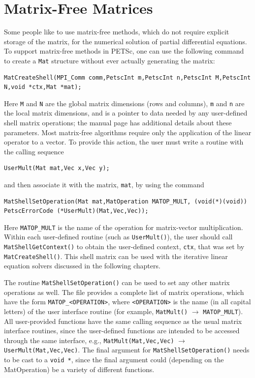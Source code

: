 \section{Matrix-Free Matrices} 
\label{sec_matrixfree}
Some people like to use matrix-free methods, which do not require
explicit storage of the matrix, for the numerical solution of partial
differential equations.  To support matrix-free methods in PETSc, one
can use the following command to create a \lstinline{Mat} structure without
ever actually generating the matrix:
\begin{lstlisting}
MatCreateShell(MPI_Comm comm,PetscInt m,PetscInt n,PetscInt M,PetscInt N,void *ctx,Mat *mat);
\end{lstlisting}
Here \lstinline{M} and \lstinline{N} are the global matrix dimensions (rows and
columns), \lstinline{m} and \lstinline{n} are the local matrix dimensions, and
 is a pointer to data needed by any user-defined shell matrix
operations; the manual page has additional details about these
parameters.  Most matrix-free algorithms require only the application
of the linear operator to a vector. To provide this action, the user
must write a routine with the calling sequence
\begin{lstlisting}
UserMult(Mat mat,Vec x,Vec y);
\end{lstlisting}
and then associate it with the matrix, \lstinline{mat}, by using the
command
\begin{lstlisting}
MatShellSetOperation(Mat mat,MatOperation MATOP_MULT, (void(*)(void)) PetscErrorCode (*UserMult)(Mat,Vec,Vec));
\end{lstlisting}
Here \lstinline{MATOP_MULT} is the name of the operation for matrix-vector
multiplication. Within each user-defined routine (such as
\lstinline{UserMult()}), the user should call
\lstinline{MatShellGetContext()} to obtain the user-defined context, \lstinline{ctx},
that was set by \lstinline{MatCreateShell()}.
This shell matrix can be used with the iterative linear
equation solvers discussed in the following chapters.

The routine \lstinline{MatShellSetOperation()} can be used to set any other
matrix operations as well.  The file
\href{https://www.mcs.anl.gov/petsc/petsc-current/include/petscmat.h.html}{} provides a complete list of matrix
operations, which have the form \lstinline{MATOP_<OPERATION>}, where \lstinline{<OPERATION>} is the name (in all capital letters) of the user
interface routine (for example, \lstinline{MatMult()} $ \to $ \lstinline{MATOP_MULT}).  All
user-provided functions have the same calling sequence as the
usual matrix interface routines, since the user-defined functions are
intended to be accessed through the same interface, e.g.,
\lstinline{MatMult(Mat,Vec,Vec)} $ \to$ \lstinline{UserMult(Mat,Vec,Vec)}.
The final argument for \lstinline{MatShellSetOperation()} needs to be cast
to a \lstinline{void *}, since the final argument could (depending on the
MatOperation) be a variety of different functions.

